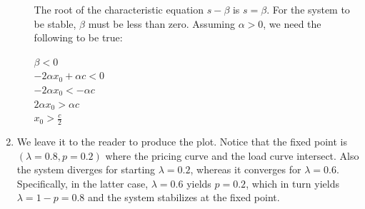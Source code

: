 \documentclass{article}
\begin{document}
\begin{enumerate}
\begin{itemize}
\noindent The root of the characteristic equation $s - \beta$ is
$s = \beta$. For the system to be stable, $\beta$ must be less
than zero. Assuming $\alpha > 0$, we need the following to be
true: \bigbreak

\noindent $\beta < 0$\\
\noindent $-2 \alpha x_0 + \alpha c < 0$\\
\noindent $-2 \alpha x_0 < -\alpha c$\\
\noindent $2 \alpha x_0 > \alpha c$\\
\noindent $x_0 > {\frac{c}{2}}$ \bigbreak


\end{itemize}


\item We leave it to the reader to produce the plot. Notice that the fixed point is $(\lambda=0.8, p=0.2)$  where the pricing curve and the load curve intersect. Also the system diverges for starting $\lambda=0.2$, whereas it converges for $\lambda=0.6.$ Specifically, in the latter case, $\lambda=0.6$ yields $p=0.2$, which in turn yields $\lambda=1-p=0.8$ and the system stabilizes at the fixed point.



\end{enumerate}



\end{document}
